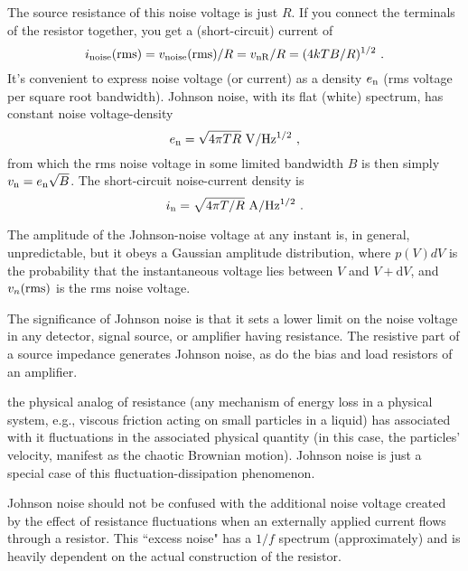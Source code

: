 \documentclass[11pt,a4paper]{article}
\newcommand{\dif}{\mathrm{d}}
\begin{document}
The source resistance of this noise voltage is just $R$. If you connect the terminals of the resistor together, you get a (short-circuit) current of
\begin{equation}
i_{\rm noise} ({\rm rms}) = v_{\rm noise} ({\rm rms}) / R = v_{\rm nR} / R = (4k T B/R)^{1/2} ~.
\end{equation}
It's convenient to express noise voltage (or current) as a density $e_{\rm n}$ (rms voltage per square root bandwidth). Johnson noise, with its flat (white) spectrum, has constant noise voltage-density
\begin{equation}
e_{\rm n} = \sqrt{4 \pi T R} ~ {\rm V/Hz^{1/2} } ~,
\end{equation}
from which the rms noise voltage in some limited bandwidth $B$ is then simply $v_{\rm n} = e_{\rm n} \sqrt{B}$. The short-circuit noise-current density is
\begin{equation}
i_{\rm n} = \sqrt{4 \pi T /R} ~ {\rm A/Hz^{1/2} } ~.
\end{equation}



The amplitude of the Johnson-noise voltage at any instant is, in general, unpredictable, but it obeys a Gaussian amplitude distribution, where $p(V)dV$ is the probability that the instantaneous voltage lies between $V$ and $V+\dif V$, and $v_n({\rm rms})$ is the rms noise voltage.

The significance of Johnson noise is that it sets a lower limit on the noise voltage in any detector, signal source, or amplifier having resistance. The resistive part of a source impedance generates Johnson noise, as do the bias and load resistors of an amplifier.

the physical analog of resistance (any mechanism of energy loss in a physical system, e.g., viscous friction acting on small particles in a liquid) has associated with it fluctuations in the associated physical quantity (in this case, the particles' velocity, manifest as the chaotic Brownian motion). Johnson noise is just a special case of this fluctuation-dissipation phenomenon.

Johnson noise should not be confused with the additional noise voltage created by the effect of resistance fluctuations when an externally applied current flows through a resistor. This ``excess noise" has a $1/f$ spectrum (approximately) and is heavily dependent on the actual construction of the resistor.
\end{document}
